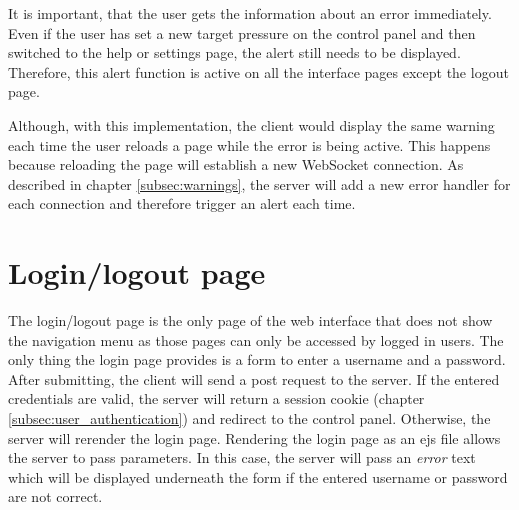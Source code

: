 It is important, that the user gets the information about an error immediately. Even if the user has set a new target pressure on the control panel and then switched to the help or settings page, the alert still needs to be displayed. Therefore, this alert function is active on all the interface pages except the logout page.

Although, with this implementation, the client would display the same warning each time the user reloads a page while the error is being active. This happens because reloading the page will establish a new WebSocket connection. As described in chapter \ref{subsec:warnings}, the server will add a new error handler for each connection and therefore trigger an alert each time. 






\section{Login/logout page}
\label{sec:login_and_logout_page}

The login/logout page is the only page of the web interface that does not show the navigation menu as those pages can only be accessed by logged in users. The only thing the login page provides is a form to enter a username and a password. After submitting, the client will send a post request to the server. If the entered credentials are valid, the server will return a session cookie (chapter \ref{subsec:user_authentication}) and redirect to the control panel. Otherwise, the server will rerender the login page. Rendering the login page as an ejs file allows the server to pass parameters. In this case, the server will pass an \textit{error} text which will be displayed underneath the form if the entered username or password are not correct.





